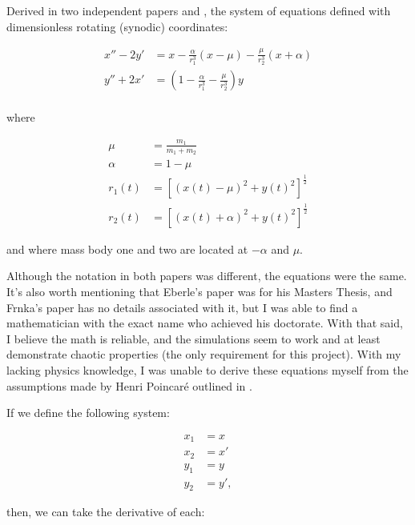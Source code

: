 \documentclass{article}
\begin{document}
Derived in two independent papers \cite{eberle2007case} and \cite{frnkacase},
the system of equations defined with dimensionless rotating (synodic)
coordinates:

\begin{align}
    x'' - 2 y' &= x
        - \frac{\alpha}{r_1^3} (x - \mu)
        - \frac{\mu}{r_2^3} (x + \alpha) \nonumber \\
    y'' + 2 x' &= \left(
        1 - \frac{\alpha}{r_1^3}
        - \frac{\mu}{r_2^3}
    \right) y \nonumber \\
\end{align}

where 

\begin{align}
    \mu &= \frac{m_1}{m_1 + m_2} \nonumber \\
    \alpha &= 1 - \mu \nonumber \\
    r_1(t) &= \left[(x(t) - \mu)^2 + y(t)^2\right]^{\frac{1}{2}} \nonumber \\
    r_2(t) &= \left[(x(t) + \alpha)^2 + y(t)^2\right]^{\frac{1}{2}} \label{eq:reduc_3body_cor}
\end{align}
 
and where mass body one and two are located at $-\alpha$ and $\mu$.

Although the notation in both papers was different, the equations were the
same. It's also worth mentioning that Eberle's paper was for his Masters
Thesis, and Frnka's paper has no details associated with it, but I was able
to find a mathematician with the exact name who achieved his doctorate. With
that said, I believe the math is reliable, and the simulations seem to work
and at least demonstrate chaotic properties (the only requirement for this
project). With my lacking physics knowledge, I was unable to derive these
equations myself from the assumptions made by Henri Poincaré outlined in
\cite{chenciner2000remarkable}.

If we define the following system:

\begin{align}
    x_1 &= x \nonumber \\
    x_2 &= x' \nonumber \\
    y_1 &= y \nonumber \\
    y_2 &= y', \label{eq:first_order_def}
\end{align}

then, we can take the derivative of each:
\end{document}
